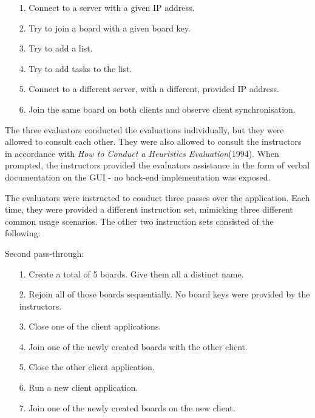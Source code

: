 \begin{itemize}
    \item [1.] Connect to a server with a given IP address.
    \item [2.] Try to join a board with a given board key.
    \item [3.] Try to add a list.
    \item [4.] Try to add tasks to the list.
    \item [5.] Connect to a different server, with a different, provided IP address.
    \item [6.] Join the same board on both clients and observe client synchronisation.
\end{itemize}

The three evaluators conducted the evaluations individually, but they were allowed to consult each other. They were also allowed to consult the instructors in accordance with \emph{How to Conduct a Heuristics Evaluation}(1994). When prompted, the instructors provided the evaluators assistance in the form of verbal documentation on the GUI - no back-end implementation was exposed. 

The evaluators were instructed to conduct three passes over the application. Each time, they were provided a different instruction set, mimicking three different common usage scenarios. The other two instruction sets consisted of the following:

Second pass-through:
\begin{itemize}
    \item [1.] Create a total of 5 boards. Give them all a distinct name.
    \item [2.] Rejoin all of those boards sequentially. No board keys were provided by the instructors.
    \item [3.] Close one of the client applications. 
    \item [4.] Join one of the newly created boards with the other client.
    \item [5.] Close the other client application.
    \item [6.] Run a new client application. 
    \item [7.] Join one of the newly created boards on the new client.
\end{itemize}

